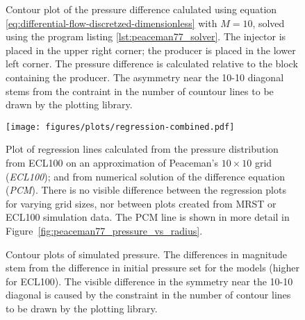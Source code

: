 \begin{figure}[htbp]
    \centering
    \scalebox{0.7}{}
    \caption{Contour plot of the pressure difference calulated using equation \eqref{eq:differential-flow-discretzed-dimensionless} with $M=10$, solved using the program listing \ref{lst:peaceman77_solver}. The injector is placed in the upper right corner; the producer is placed in the lower left corner. The pressure difference is calculated relative to the block containing the producer. The asymmetry near the 10-10 diagonal stems from the contraint in the number of countour lines to be drawn by the plotting library.}
    \label{fig:pressure_drop_contour}
\end{figure}

\begin{figure}[htbp]
    \centering
    \texttt{[image: figures/plots/regression-combined.pdf]}
    \caption{Plot of regression lines calculated from the pressure distribution from ECL100 on an approximation of Peaceman's $10\times 10$ grid (\emph{ECL100}); and from numerical solution of the difference equation (\emph{PCM}). There is no visible difference between the regression plots for varying grid sizes, nor between plots created from MRST or ECL100 simulation data. The PCM line is shown in more detail in Figure~\ref{fig:peaceman77_pressure_vs_radius}.}
    \label{fig:regression-combined}
\end{figure}

\begin{figure}
    \begin{minipage}[b]{.5\linewidth}
        \centering\scalebox{.53}{}
        \label{fig:contour-ecl10}
    \end{minipage}%
    \begin{minipage}[b]{.5\linewidth}
        \centering\scalebox{.53}{}
        \label{fig:contour-mrst10}
    \end{minipage}
    \caption{Contour plots of simulated pressure. The differences in magnitude stem from the difference in initial pressure set for the models (higher for ECL100). The visible difference in the symmetry near the 10-10 diagonal is caused by the constraint in the number of contour lines to be drawn by the plotting library.}
    \label{fig:contours-ect10-mrst10}
\end{figure}


